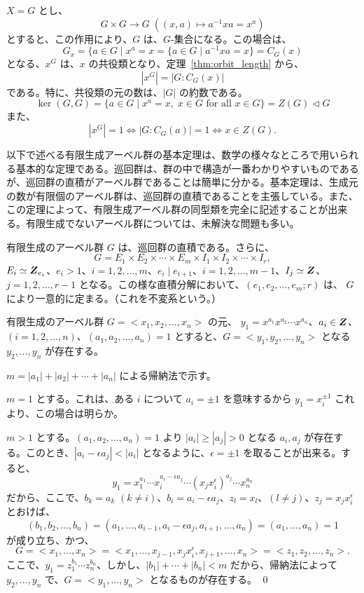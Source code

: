 \begin{eg}
$X = G$ とし、
$$G\times G \to G \;((x,a)\mapsto a^{-1}xa = x^a)$$
とすると、この作用により、$G$ は、$G$-集合になる。この場合は、
$$G_x = \{a\in G\mid x^a = x = \{a\in G\mid a^{-1}xa = x\} = C_G(x)$$
となる、$x^G$ は、$x$ の共役類となり、定理~\ref{thm:orbit_length} から、
$$|x^G| = |G:C_G(x)|$$
である。特に、共役類の元の数は、$|G|$ の約数である。
$$\ker(G,G) = \{a\in G\mid x^a = x,\;x\in G\mbox{ for all }x\in G\} = Z(G)\lhd G$$
また、
$$|x^G| = 1 \Leftrightarrow |G:C_G(a)| = 1 \Leftrightarrow x\in Z(G).$$
\end{eg}



\newpage
{}
以下で述べる有限生成アーベル群の基本定理は、数学の様々なところで用いられる基本的な定理である。巡回群は、群の中で構造が一番わかりやすいものであるが、巡回群の直積がアーベル群であることは簡単に分かる。基本定理は、生成元の数が有限個のアーベル群は、巡回群の直積であることを主張している。また、この定理によって、有限生成アーベル群の同型類を完全に記述することが出来る。有限生成でないアーベル群については、未解決な問題も多い。

\begin{thm} \label{thm:fin_gen_abelian}
有限生成のアーベル群 $G$ は、巡回群の直積である。さらに、
$$G = E_1\times E_2 \times \cdots \times E_m \times I_1 \times I_2 \times \cdots \times I_r,$$
$E_i\simeq \mbox{\boldmath $Z$}_{e_i}$、$e_i>1$、$i = 1, 2, \ldots, m$、$e_i\mid e_{i+1}$、$i = 1, 2, \ldots, m-1$、$I_j\simeq \mbox{\boldmath $Z$}$、$j = 1, 2, \ldots, r-1$ となる。この様な直積分解において、$(e_1,e_2,\ldots, e_m;r)$ は、 $G$ により一意的に定まる。（これを不変系という。）
\end{thm}

\begin{lemma} \label{lemma:reduction}
有限生成のアーベル群 $G = <x_1,x_2,\ldots, x_n>$ の元、
$y_1 = x^{a_1}x^{a_2}\cdots x^{a_n}$、$a_i\in \mbox{\boldmath $Z$}$、$(i = 1,2,\ldots, n)$、$(a_1,a_2,\ldots, a_n) = 1$ とすると、$G = <y_1,y_2,\ldots, y_n>$ となる $y_2, \ldots, y_n$ が存在する。
\end{lemma}
\proof
$m = |a_1| + |a_2| + \cdots + |a_n|$ による帰納法で示す。

$m = 1$ とする。これは、ある $i$ について $a_i = \pm 1$ を意味するから $y_1 = x_i^{\pm 1}$ これより、この場合は明らか。

$m > 1$ とする。$(a_1,a_2,\ldots, a_n) = 1$ より $|a_i| \geq |a_j| > 0$ となる $a_i, a_j$ が存在する。このとき、$|a_i - \epsilon a_j| < |a_i|$ となるように、$\epsilon = \pm 1$ を取ることが出来る。すると、
$$y_1 = x_1^{a_1}\cdots x_i^{a_i-\epsilon a_j}\cdots (x_jx_i^{\epsilon})^{a_j}\cdots x_n^{a_n}$$
だから、ここで、$b_k = a_k$ $(k\neq i)$、$b_i = a_i-\epsilon a_j$、$z_l = x_l$、$(l\neq j)$、$z_j = x_jx_i^{\epsilon}$ とおけば、
$$(b_1,b_2,\ldots, b_n) = (a_1,\ldots, a_{i-1},a_i-\epsilon a_j,a_{i+1},\ldots, a_n) = (a_1,\ldots, a_n) = 1$$ 
が成り立ち、かつ、
$$G = <x_1,\ldots, x_n> = <x_1,\ldots, x_{j-1},x_jx_i^{\epsilon},x_{j+1},\ldots, x_n> =<z_1,z_2,\ldots, z_n>.$$
ここで、$y_1 = z_1^{b_1}\cdots z_n^{b_n}$、しかし、$|b_1| + \cdots + |b_n| < m$  だから、帰納法によって $y_2, \ldots, y_n$ で、$G = <y_1,\ldots, y_n>$ となるものが存在する。
\qed

